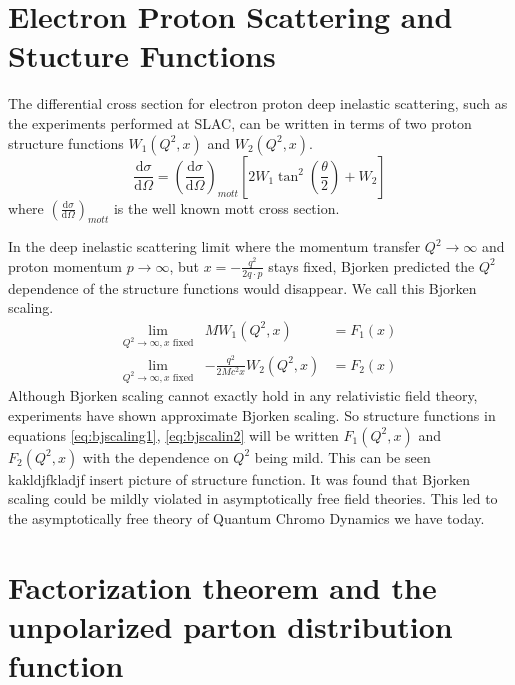 \documentclass[abstract = on,listof=totoc, bibliography=totoc]{scrreprt}
\begin{document}
\section{Electron Proton Scattering and Stucture Functions}

The differential cross section for electron proton deep inelastic scattering, such as the experiments performed at SLAC, can be written in terms of two proton structure functions $W_1(Q^2, x)$ and $W_2(Q^2, x)$.
\begin{equation}
\frac{\text{d}\sigma}{\text{d}\Omega} = \left(\frac{\text{d}\sigma}{\text{d}\Omega}\right)_{mott}\left[2W_1\tan^2\left(\frac{\theta}{2}\right) + W_2\right]
\end{equation}
where $\left(\frac{\text{d}\sigma}{\text{d}\Omega}\right)_{mott}$ is the well known mott cross section.

In the deep inelastic scattering limit where the momentum transfer $Q^2\rightarrow\infty$ and proton momentum $p\rightarrow\infty$, but $x = -\frac{q^2}{2q\cdot p}$ stays fixed, Bjorken predicted the $Q^2$ dependence of the structure functions would disappear. We call this Bjorken scaling.
\begin{eqnarray}
\lim\limits_{Q^2\rightarrow\infty, x \text{ fixed}}& MW_1(Q^2,x) &= F_1(x) \label{eq:bjscaling1}\\
\lim\limits_{Q^2\rightarrow\infty, x \text{ fixed}}& -\frac{q^2}{2Mc^2x}W_2(Q^2,x) &= F_2(x) \label{eq:bjscaling2}
\end{eqnarray}
Although Bjorken scaling cannot exactly hold in any relativistic field theory, experiments have shown approximate Bjorken scaling. So structure functions in equations \ref{eq:bjscaling1}, \ref{eq:bjscalin2} will be written $F_1(Q^2,x)$ and $F_2(Q^2,x)$ with the dependence on $Q^2$ being mild. This can be seen kakldjfkladjf insert picture of structure function. It was found that Bjorken scaling could be mildly violated in asymptotically free field theories. This led to the asymptotically free theory of Quantum Chromo Dynamics we have today. 



\section{Factorization theorem and the unpolarized parton distribution function}
\end{document}
